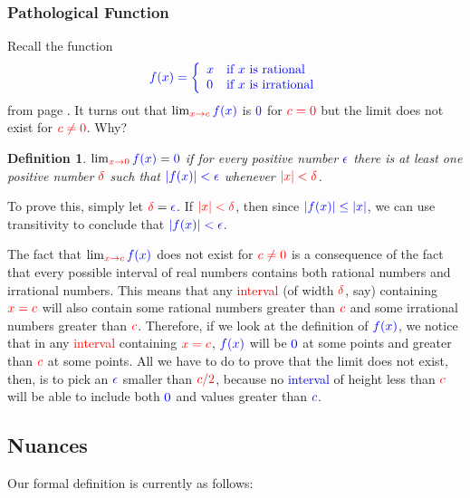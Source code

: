 \documentclass{myarticle}
\newcommand{\hor}[1]{\textcolor{red}{#1}} %
\newcommand{\ver}[1]{\textcolor{blue}{#1}}
\theoremstyle{nospace}
\newtheorem*{oldattempt}{Definition}
\newenvironment{attempt}{\begin{mdframed}\begin{oldattempt}}{\end{oldattempt}\end{mdframed}}
\newtheorem{old series theorem}{Theorem}
\newenvironment{series theorem}{\begin{mdframed}\begin{old series theorem}}{\end{old series theorem}\end{mdframed}}
\begin{document}
\subsubsection{Pathological Function} \label{sec:pathological function}

Recall the function \[ \ver{f(x) = \left\{\begin{array}{ll}
x & \text{if $x$ is rational} \\
0 & \text{if $x$ is irrational} \\
\end{array}\right.} \] from page \pageref{eq:dirichlet}. It turns out that $\lim_{\hor{x \to c}} \ver{f(x)}$ is $\ver{0}$ for $\hor{c = 0}$ but the limit does not exist for $\hor{c \neq 0}$. Why?

\begin{attempt} $\lim_{\hor{x \to 0}} \ver{f(x)} = \ver{0}$ if for every positive number $\ver{\epsilon}$ there is at least one positive number $\hor{\delta}$ such that $\ver{|f(x)| < \epsilon}$ whenever $\hor{|x| < \delta}$. \end{attempt}

To prove this, simply let $\hor{\delta} = \ver{\epsilon}$. If $\hor{|x| < \delta}$, then since $\ver{|f(x)| \leq |x|}$, we can use transitivity to conclude that $\ver{|f(x)| < \epsilon}$.

The fact that $\lim_{\hor{x \to c}} \ver{f(x)}$ does not exist for $\hor{c \neq 0}$ is a consequence of the fact that every possible interval of real numbers contains both rational numbers and irrational numbers. This means that any \hor{interval} (of width $\hor{\delta}$, say) containing $\hor{x = c}$ will also contain some rational numbers greater than $\hor{c}$ and some irrational numbers greater than $\hor{c}$. Therefore, if we look at the definition of $\ver{f(x)}$, we notice that in any \hor{interval} containing $\hor{x = c}$, $\ver{f(x)}$ will be $\ver{0}$ at some points and greater than $\hor{c}$ at some points. All we have to do to prove that the limit does not exist, then, is to pick an $\ver{\epsilon}$ smaller than $\hor{c/2}$, because no \ver{interval} of height less than $\hor{c}$ will be able to include both $\ver{0}$ and values greater than $\ver{c}$.

\subsection{Nuances} \label{sec:limit definition nuances}

Our formal definition is currently as follows:
\end{document}
